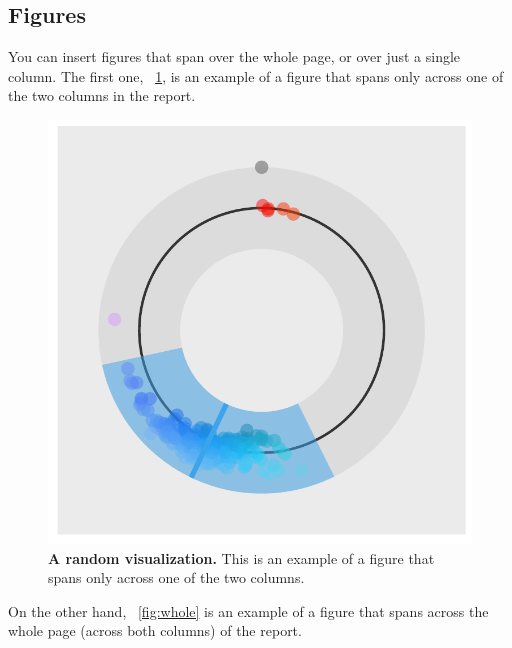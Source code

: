 \documentclass[fleqn,moreauthors,10pt]{ds_report}
\begin{document}
\subsection*{Figures}

You can insert figures that span over the whole page, or over just a single column. The first one, \figurename~\ref{fig:column}, is an example of a figure that spans only across one of the two columns in the report.

\begin{figure}[ht]\centering
	\includegraphics[width=\linewidth]{single_column.pdf}
	\caption{\textbf{A random visualization.} This is an example of a figure that spans only across one of the two columns.}
	\label{fig:column}
\end{figure}

On the other hand, \figurename~\ref{fig:whole} is an example of a figure that spans across the whole page (across both columns) of the report.
\end{document}
